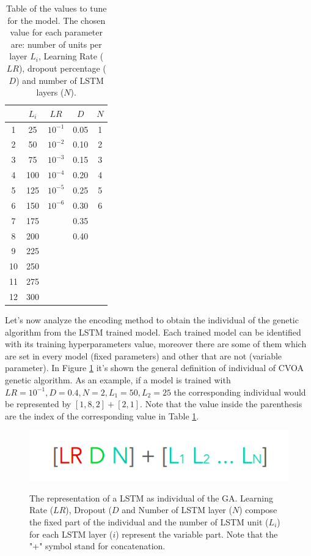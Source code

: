 \documentclass[letterpaper]{article}%
\begin{document}
\begin{table}[!h]
	\caption{Table of the values to tune for the model. The chosen value for each parameter are: number of units per layer $ L_i $, Learning Rate ($ LR $), dropout percentage ($ D $) and number of LSTM layers ($ N $). }
	\begin{tabular}{ccccc}
		   &$L_i$ &   $ LR $ 	& $D $ & $N$\\ 
	\hline
		1  & 25   & $ 10^{-1} $	& 0.05 & 1	\\
		2  & 50   & $ 10^{-2} $ & 0.10 & 2 	\\
		3  & 75   & $ 10^{-3} $ & 0.15 & 3 	\\
		4  & 100  & $ 10^{-4} $ & 0.20 & 4 	\\
		5  & 125  & $ 10^{-5} $ & 0.25 & 5 	\\
		6  & 150  & $ 10^{-6} $ & 0.30 & 6 	\\
		7  & 175  &  			& 0.35 &   	\\
		8  & 200  &  			& 0.40 &   	\\
		9  & 225  &  			&      &   	\\
		10 & 250  &  			&      &   	\\
		11 & 275  &  			&      &   	\\
		12 & 300  &  			&      &   	\\
	\end{tabular}

	\label{tab:params}
\end{table}

Let's now analyze the encoding method to obtain the individual of the genetic algorithm from the LSTM trained model. Each trained model can be identified with its training hyperparameters value, moreover there are some of them which are set in every model (fixed parameters) and other that are not (variable parameter). In Figure \ref{fig:individual} it's shown the general definition of individual of CVOA genetic algorithm. As an example, if a model is trained with $ LR = 10^{-1}, D = 0.4, N = 2, L_1 = 50, L_2 = 25 $ the corresponding individual would be represented by $ [1, 8, 2] + [2, 1] $. Note that the value inside the parenthesis are the index of the corresponding value in Table \ref{tab:params}. 

\begin{figure}
	\caption{The representation of a LSTM as individual of the GA. Learning Rate ($ LR $), Dropout ($ D $ and Number of LSTM layer ($ N $) compose the fixed part of the individual and the number of LSTM unit ($ L_i $) for each LSTM layer ($ i $) represent the variable part. Note that the "+" symbol stand for concatenation.}
	\includegraphics[width=\columnwidth]{img/individual}
	\label{fig:individual}
\end{figure}
\end{document}
